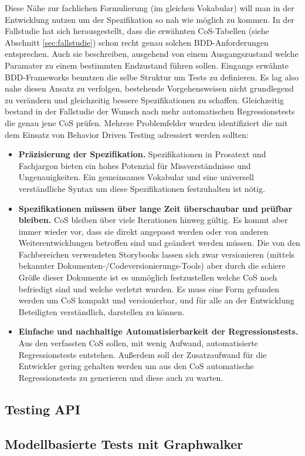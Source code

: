 Diese Nähe zur fachlichen Formulierung (im gleichen Vokabular) will man in der Entwicklung nutzen um der Spezifikation so nah wie möglich zu kommen. In der Fallstudie hat sich herausgestellt, dass die erwähnten CoS-Tabellen (siehe Abschnitt \ref{sec:fallstudie}) schon recht genau solchen BDD-Anforderungen entsprechen. Auch sie beschreiben, ausgehend von einem Ausgangszustand welche Paramater zu einem bestimmten Endzustand führen sollen. Eingangs erwähnte BDD-Frameworks benutzen die selbe Struktur um Tests zu definieren. Es lag also nahe diesen Ansatz zu verfolgen, bestehende Vorgehensweisen nicht grundlegend zu verändern und gleichzeitig bessere Spezifikationen zu schaffen. Gleichzeitig bestand in der Fallstudie der Wunsch nach mehr automatischen Regressionstests die genau jene CoS prüfen. Mehrere Problemfelder wurden identifiziert die mit dem Einsatz von Behavior Driven Testing adressiert werden sollten:


\begin{itemize}
\item \textbf{Präzisierung der Spezifikation.} Spezifikationen in Prosatext und Fachjargon bieten ein hohes Potenzial für Missverständnisse und Ungenauigkeiten. Ein gemeinsames Vokabular und eine universell verständliche Syntax um diese Spezifikationen festzuhalten ist nötig.
\item \textbf{Spezifikationen müssen über lange Zeit überschaubar und prüfbar bleiben.} CoS bleiben über viele Iterationen hinweg gültig. Es kommt aber immer wieder vor, dass sie direkt angepasst werden oder von anderen Weiterentwicklungen betroffen sind und geändert werden müssen. Die von den Fachbereichen verwendeten Storybooks lassen sich zwar versionieren (mittels bekannter Dokumenten-/Codeversionierungs-Tools) aber durch die schiere Größe dieser Dokumente ist es unmöglich festzustellen welche CoS noch befriedigt sind und welche verletzt wurden. Es muss eine Form gefunden werden um CoS kompakt und versionierbar, und für alle an der Entwicklung Beteiligten verständlich, darstellen zu können.
\item \textbf{Einfache und nachhaltige Automatisierbarkeit der Regressionstests.} Aus den verfassten CoS sollen, mit wenig Aufwand, automatisierte Regressionstests entstehen. Außerdem soll der Zusatzaufwand für die Entwickler gering gehalten werden um aus den CoS automatische Regressionstests zu generieren und diese auch zu warten.
\end{itemize}



\subsection{Testing API}
\label{sec:testing_api}

\subsection{Modellbasierte Tests mit Graphwalker}
























